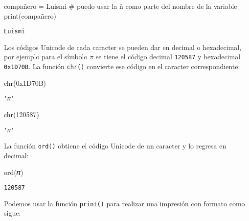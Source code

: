\documentclass[
  letterpaper,
  DIV=11,
  numbers=noendperiod]{scrreprt}
\newenvironment{Shaded}{\begin{snugshade}}{\end{snugshade}}
\newcommand{\BaseNTok}[1]{\textcolor[rgb]{0.68,0.00,0.00}{#1}}
\newcommand{\BuiltInTok}[1]{\textcolor[rgb]{0.00,0.23,0.31}{#1}}
\newcommand{\CommentTok}[1]{\textcolor[rgb]{0.37,0.37,0.37}{#1}}
\newcommand{\DecValTok}[1]{\textcolor[rgb]{0.68,0.00,0.00}{#1}}
\newcommand{\NormalTok}[1]{\textcolor[rgb]{0.00,0.23,0.31}{#1}}
\newcommand{\OperatorTok}[1]{\textcolor[rgb]{0.37,0.37,0.37}{#1}}
\newcommand{\StringTok}[1]{\textcolor[rgb]{0.13,0.47,0.30}{#1}}
\begin{document}
\begin{Shaded}
\begin{Highlighting}[]
\NormalTok{compañero }\OperatorTok{=} \StringTok{\textquotesingle{}Luismi\textquotesingle{}} \CommentTok{\# puedo usar la ñ como parte del nombre de la variable}
\BuiltInTok{print}\NormalTok{(compañero)}
\end{Highlighting}
\end{Shaded}

\begin{verbatim}
Luismi
\end{verbatim}

Los códigos Unicode de cada caracter se pueden dar en decimal o
hexadecimal, por ejemplo para el símbolo \(\pi\) se tiene el código
decimal \texttt{120587} y hexadecimal \texttt{0x1D70B}. La función
\texttt{chr()} convierte ese código en el caracter correspondiente:

\begin{Shaded}
\begin{Highlighting}[]
\BuiltInTok{chr}\NormalTok{(}\BaseNTok{0x1D70B}\NormalTok{)}
\end{Highlighting}
\end{Shaded}

\begin{verbatim}
'𝜋'
\end{verbatim}

\begin{Shaded}
\begin{Highlighting}[]
\BuiltInTok{chr}\NormalTok{(}\DecValTok{120587}\NormalTok{)}
\end{Highlighting}
\end{Shaded}

\begin{verbatim}
'𝜋'
\end{verbatim}

La función \texttt{ord()} obtiene el código Unicode de un caracter y lo
regresa en decimal:

\begin{Shaded}
\begin{Highlighting}[]
\BuiltInTok{ord}\NormalTok{(}\StringTok{\textquotesingle{}𝜋\textquotesingle{}}\NormalTok{)}
\end{Highlighting}
\end{Shaded}

\begin{verbatim}
120587
\end{verbatim}

Podemos usar la función \texttt{print()} para realizar una impresión con
formato como sigue:
\end{document}
